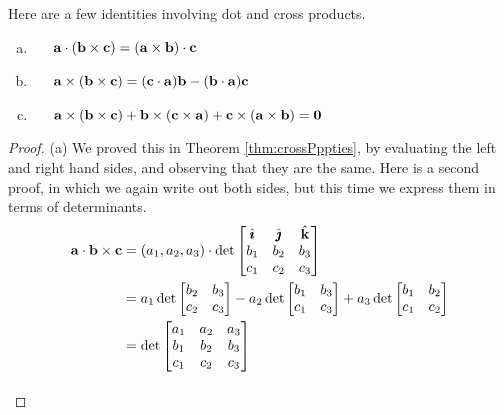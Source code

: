 Here are a few identities involving dot and cross products.
\begin{lemma}\label{lem:tripProd}
\begin{enumerate}[(a)]
\item\ \ \ 
$\mathbf{a}\cdot(\mathbf{b}\times\mathbf{c})=(\mathbf{a}\times\mathbf{b})\cdot\mathbf{c}$
\item\ \ \ 
$\mathbf{a}\times(\mathbf{b}\times\mathbf{c})=(\mathbf{c}\cdot\mathbf{a})\mathbf{b}-(\mathbf{b}\cdot\mathbf{a})\mathbf{c}$
\item\ \ \ 
           $\mathbf{a}\times(\mathbf{b}\times\mathbf{c}) + 
            \mathbf{b}\times(\mathbf{c}\times\mathbf{a}) +
            \mathbf{c}\times(\mathbf{a}\times\mathbf{b}) =\mathbf{0}$
\end{enumerate}
\end{lemma}
\begin{proof} (a)
We proved this in Theorem \ref{thm:crossPppties}, by evaluating the left and right hand  sides, and observing that they are the same.
Here is a second proof, in which we again write out both sides, 
but this time we express them in terms of determinants.
\begin{align*}
\va\cdot\vb\times\vc
&=(a_1,a_2,a_3)\cdot\det\left[\begin{matrix}\hi&\hj&\hk\\
                                       b_1&b_2&b_3\\
                                       c_1&c_2&c_3\end{matrix}\right]\\
&=a_1\det\left[\begin{matrix}
                                       b_2&b_3\\
                                       c_2&c_3\end{matrix}\right]
                             -a_2\det\left[\begin{matrix}
                                       b_1&b_3\\
                                       c_1&c_3\end{matrix}\right]
                             +a_3\det\left[\begin{matrix}
                                       b_1&b_2\\
                                       c_1&c_2\end{matrix}\right]\\
&=\det\left[\begin{matrix}a_1&a_2&a_3\\
                                       b_1&b_2&b_3\\
                                       c_1&c_2&c_3\end{matrix}\right]\\[0.1in]

\end{align*}
\end{proof}
